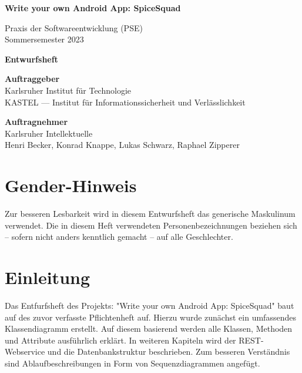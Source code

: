 \documentclass[parskip=full]{scrartcl}
\begin{document}


\begin{titlepage}
    \begin{center}
        \begin{Huge}
            {\textbf{Write your own Android App: SpiceSquad}}
        \end{Huge}
        \vspace{12px}

        Praxis der Softwareentwicklung (PSE)\\
        Sommersemester 2023\\
        \vspace{150px}

        \begin{Huge}
            {\textbf{Entwurfsheft}}
        \end{Huge}
        \vspace{12px}

        \textbf{Auftraggeber}\\
        Karlsruher Institut für Technologie\\
        KASTEL — Institut für Informationssicherheit und Verlässlichkeit\\
        \vspace{330px}

        \textbf{Auftragnehmer}\\
        Karlsruher Intellektuelle\\
        Henri Becker, Konrad Knappe, Lukas Schwarz, Raphael Zipperer\\
    \end{center}
\end{titlepage}

\tableofcontents
\newpage

\section*{Gender-Hinweis}
Zur besseren Lesbarkeit wird in diesem Entwurfsheft das generische Maskulinum verwendet.
Die in diesem Heft verwendeten Personenbezeichnungen beziehen sich – sofern nicht anders kenntlich gemacht – auf alle Geschlechter.
\newpage

\section{Einleitung}
Das Entfurfsheft des Projekts: "Write your own Android App: SpiceSquad" baut auf des zuvor verfasste Pflichtenheft auf.
Hierzu wurde zunächst ein umfassendes Klassendiagramm erstellt. Auf diesem basierend werden alle Klassen, Methoden und Attribute ausführlich erklärt.
In weiteren Kapiteln wird der REST-Webservice und die Datenbankstruktur beschrieben. Zum besseren Verständnis sind Ablaufbeschreibungen in Form von Sequenzdiagrammen angefügt.
\end{document}
